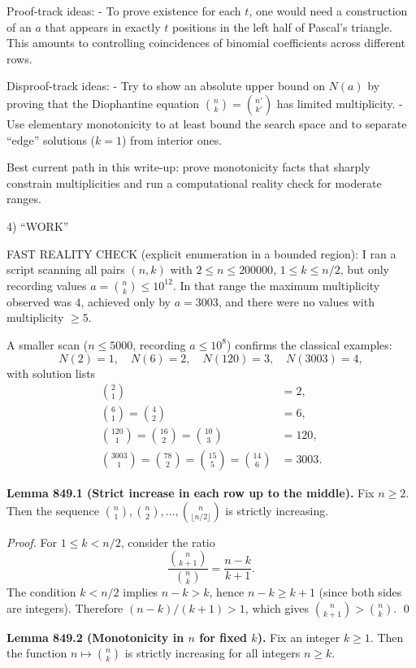 Proof-track ideas:
- To prove existence for each $t$, one would need a construction of an $a$ that appears in exactly $t$ positions in the left half of Pascal's triangle. This amounts to controlling coincidences of binomial coefficients across different rows.

Disproof-track ideas:
- Try to show an absolute upper bound on $N(a)$ by proving that the Diophantine equation $\binom{n}{k}=\binom{n'}{k'}$ has limited multiplicity.
- Use elementary monotonicity to at least bound the search space and to separate “edge” solutions ($k=1$) from interior ones.

Best current path in this write-up: prove monotonicity facts that sharply constrain multiplicities and run a computational reality check for moderate ranges.

4) “WORK”

FAST REALITY CHECK (explicit enumeration in a bounded region):
I ran a script scanning all pairs $(n,k)$ with $2\le n\le 200000$, $1\le k\le n/2$, but only recording values $a=\binom{n}{k}\le 10^{12}$. In that range the maximum multiplicity observed was $4$, achieved only by $a=3003$, and there were no values with multiplicity $\ge 5$.

A smaller scan ($n\le 5000$, recording $a\le 10^8$) confirms the classical examples:
\[
N(2)=1,\quad N(6)=2,\quad N(120)=3,\quad N(3003)=4,
\]
with solution lists
\[
\begin{aligned}
\binom{2}{1}&=2,\\
\binom{6}{1}=\binom{4}{2}&=6,\\
\binom{120}{1}=\binom{16}{2}=\binom{10}{3}&=120,\\
\binom{3003}{1}=\binom{78}{2}=\binom{15}{5}=\binom{14}{6}&=3003.
\end{aligned}
\]

\textbf{Lemma 849.1 (Strict increase in each row up to the middle).}
Fix $n\ge 2$. Then the sequence $\binom{n}{1},\binom{n}{2},\dots,\binom{n}{\lfloor n/2\rfloor}$ is strictly increasing.

\emph{Proof.}
For $1\le k< n/2$, consider the ratio
\[
\frac{\binom{n}{k+1}}{\binom{n}{k}}=\frac{n-k}{k+1}.
\]
The condition $k< n/2$ implies $n-k>k$, hence $n-k\ge k+1$ (since both sides are integers). Therefore $(n-k)/(k+1)>1$, which gives $\binom{n}{k+1}>\binom{n}{k}$. \qed

\textbf{Lemma 849.2 (Monotonicity in $n$ for fixed $k$).}
Fix an integer $k\ge 1$. Then the function $n\mapsto \binom{n}{k}$ is strictly increasing for all integers $n\ge k$.

